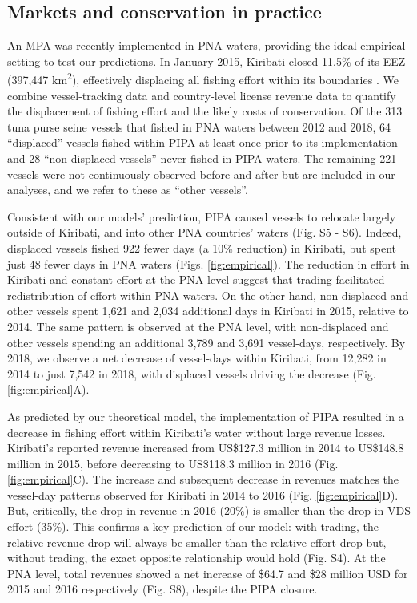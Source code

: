 \documentclass[12pt]{article}
\begin{document}
\subsection{Markets and conservation in practice}

An MPA was recently implemented in PNA waters, providing the ideal empirical setting to test our predictions. In January 2015, Kiribati closed 11.5\% of its EEZ (397,447 km\textsuperscript{2}), effectively displacing all fishing effort within its boundaries \cite{mccauley_2016,mcdermott_2018}. We combine vessel-tracking data \cite{kroodsma_2018} and country-level license revenue data \cite{ffa_2017} to quantify the displacement of fishing effort and the likely costs of conservation. Of the 313 tuna purse seine vessels that fished in PNA waters between 2012 and 2018, 64 ``displaced'' vessels fished within PIPA at least once prior to its implementation and 28 ``non-displaced vessels'' never fished in PIPA waters. The remaining 221 vessels were not continuously observed before and after but are included in our analyses, and we refer to these as ``other vessels''.

Consistent with our models' prediction, PIPA caused vessels to relocate largely outside of Kiribati, and into other PNA countries' waters (Fig. S5 - S6). Indeed, displaced vessels fished 922 fewer days (a 10\% reduction) in Kiribati, but spent just 48 fewer days in PNA waters (Figs. \ref{fig:empirical}).  The reduction in effort in Kiribati and constant effort at the PNA-level suggest that trading facilitated redistribution of effort within PNA waters. On the other hand, non-displaced and other vessels spent 1,621 and 2,034 additional days in Kiribati in 2015, relative to 2014. The same pattern is observed at the PNA level, with non-displaced and other vessels spending an additional 3,789 and 3,691 vessel-days, respectively. By 2018, we observe a net decrease of vessel-days within Kiribati, from 12,282 in 2014 to just 7,542 in 2018, with displaced vessels driving the decrease (Fig. \ref{fig:empirical}A).

As predicted by our theoretical model, the implementation of PIPA resulted in a decrease in fishing effort within Kiribati's water without large revenue losses. Kiribati's reported revenue increased from US\$127.3 million in 2014 to US\$148.8 million in 2015, before decreasing to US\$118.3 million in 2016 (Fig. \ref{fig:empirical}C). The increase and subsequent decrease in revenues matches the vessel-day patterns observed for Kiribati in 2014 to 2016 (Fig. \ref{fig:empirical}D). But, critically, the drop in revenue in 2016 (20\%) is smaller than the drop in VDS effort (35\%). This confirms a key prediction of our model: with trading, the relative revenue drop will always be smaller than the relative effort drop but, without trading, the exact opposite relationship would hold (Fig. S4). At the PNA level, total revenues showed a net increase of \$64.7 and \$28 million USD for 2015 and 2016 respectively (Fig. S8), despite the PIPA closure.
\end{document}
